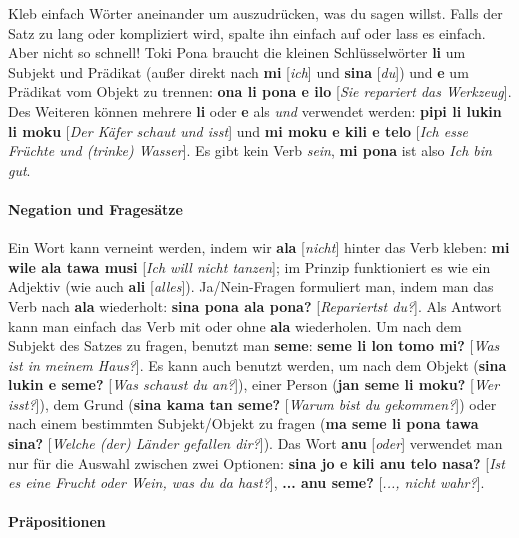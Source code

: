 \documentclass[10pt,a4paper]{article}
\begin{document}
\begin{multicols}{2}
Kleb einfach Wörter aneinander um auszudrücken, was du sagen willst. Falls der Satz zu lang oder kompliziert wird, spalte ihn einfach auf oder lass es einfach. Aber nicht so schnell! Toki Pona braucht die kleinen Schlüsselwörter \textbf{li} um Subjekt und Prädikat (außer direkt nach \textbf{mi} [\textit{ich}] und \textbf{sina} [\textit{du}]) und \textbf{e} um Prädikat vom Objekt zu trennen: \textbf{ona li pona e ilo} [\textit{Sie repariert das Werkzeug}]. Des Weiteren können mehrere \textbf{li} oder \textbf{e} als \textit{und} verwendet werden: \textbf{pipi li lukin li moku} [\textit{Der Käfer schaut und isst}] und \textbf{mi moku e kili e telo} [\textit{Ich esse Früchte und (trinke) Wasser}]. Es gibt kein Verb \textit{sein}, \textbf{mi pona} ist also \textit{Ich bin gut}.

\paragraph{Negation und Fragesätze}

Ein Wort kann verneint werden, indem wir \textbf{ala} [\textit{nicht}] hinter das Verb kleben: \textbf{mi wile ala tawa musi} [\textit{Ich will nicht tanzen}]; im Prinzip funktioniert es wie ein Adjektiv (wie auch \textbf{ali} [\textit{alles}]). Ja/Nein-Fragen formuliert man, indem man das Verb nach \textbf{ala} wiederholt: \textbf{sina pona ala pona?} [\textit{Repariertst du?}]. Als Antwort kann man einfach das Verb mit oder ohne \textbf{ala} wiederholen. Um nach dem Subjekt des Satzes zu fragen, benutzt man \textbf{seme}: \textbf{seme li lon tomo mi?} [\textit{Was ist in meinem Haus?}]. Es kann auch benutzt werden, um nach dem Objekt (\textbf{sina lukin e seme?} [\textit{Was schaust du an?}]), einer Person (\textbf{jan seme li moku?} [\textit{Wer isst?}]), dem Grund (\textbf{sina kama tan seme?} [\textit{Warum bist du gekommen?}]) oder nach einem bestimmten Subjekt/Objekt zu fragen (\textbf{ma seme li pona tawa sina?} [\textit{Welche (der) Länder gefallen dir?}]). Das Wort \textbf{anu} [\textit{oder}] verwendet man nur für die Auswahl zwischen zwei Optionen: \textbf{sina jo e kili anu telo nasa?} [\textit{Ist es eine Frucht oder Wein, was du da hast?}], \textbf{... anu seme?} [\textit{..., nicht wahr?}].
\end{multicols}

\paragraph{Präpositionen}
\end{document}
